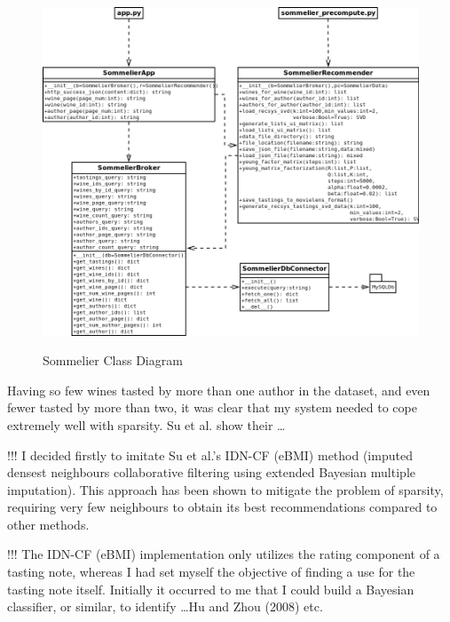 
\begin{figure}[h!]
    \caption{Sommelier Class Diagram}
    \centering
        \includegraphics[width=15cm]{SommelierClassDiagram}
    \label{fig:sommelierclasses}
\end{figure}

Having so few wines tasted by more than one author in the dataset, and even fewer tasted by more than two, it was clear that my system needed to cope extremely well with sparsity. Su et al. \cite{SuImputed} show their \ldots

!!! I decided firstly to imitate Su et al.'s \cite{SuImputed} IDN-CF (eBMI) method (imputed densest neighbours collaborative filtering using extended Bayesian multiple imputation). This approach has been shown to mitigate the problem of sparsity, requiring very few neighbours to obtain its best recommendations compared to other methods. 

!!! The IDN-CF (eBMI) implementation only utilizes the rating component of a tasting note, whereas I had set myself the objective of finding a use for the tasting note itself. Initially it occurred to me that I could build a Bayesian classifier, or similar, to identify \ldots Hu and Zhou (2008) etc.




